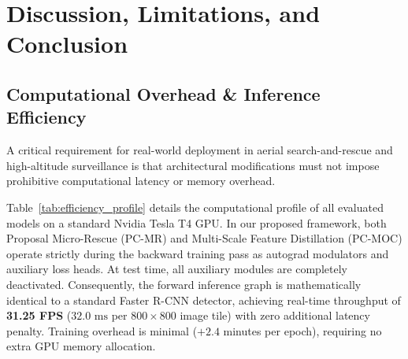 \section{Discussion, Limitations, and Conclusion}
\label{sec:discussion}

\subsection{Computational Overhead \& Inference Efficiency}
A critical requirement for real-world deployment in aerial search-and-rescue and high-altitude surveillance is that architectural modifications must not impose prohibitive computational latency or memory overhead. 

\begin{table}[h]
\centering
\caption{\textbf{Inference and Training Efficiency Profile on Nvidia Tesla T4 GPU} (evaluated on $800\times 800$ image tiles with batch size 1 for inference and batch size 2 for training).}
\label{tab:efficiency_profile}
\small
\setlength{\tabcolsep}{4.5pt}
\end{table}

Table~\ref{tab:efficiency_profile} details the computational profile of all evaluated models on a standard Nvidia Tesla T4 GPU. In our proposed framework, both Proposal Micro-Rescue (PC-MR) and Multi-Scale Feature Distillation (PC-MOC) operate strictly during the backward training pass as autograd modulators and auxiliary loss heads. At test time, all auxiliary modules are completely deactivated. Consequently, the forward inference graph is mathematically identical to a standard Faster R-CNN detector, achieving real-time throughput of \textbf{31.25 FPS} ($32.0\text{ ms}$ per $800\times 800$ image tile) with zero additional latency penalty. Training overhead is minimal ($+2.4$ minutes per epoch), requiring no extra GPU memory allocation.

